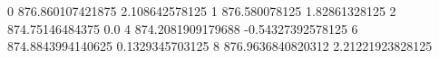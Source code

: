 0 876.860107421875 2.108642578125
1 876.580078125 1.82861328125
2 874.75146484375 0.0
4 874.2081909179688 -0.54327392578125
6 874.8843994140625 0.1329345703125
8 876.9636840820312 2.21221923828125
